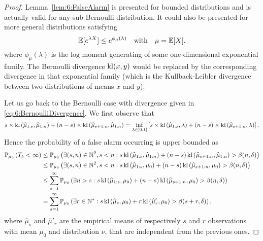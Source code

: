 \begin{proof}
Lemma~\ref{lem:6:FalseAlarm} is presented for bounded distributions and is actually valid for any sub-Bernoulli distribution. It could also be presented for more general distributions satisfying
\begin{equation}
    \mathbb{E}[e^{\lambda X} ] \leq e^{\phi_\mu(\lambda)} \ \ \text{ with } \ \ \mu=\mathbb{E}[X]\label{def:6:subExpo},
\end{equation}
where $\phi_\mu(\lambda)$ is the $\mathrm{log}$ moment generating of some one-dimensional exponential family. The Bernoulli divergence $\mathrm{kl}(x,y)$ would be replaced by the corresponding divergence in that exponential family (which is the Kullback-Leibler divergence between two distributions of means $x$ and $y$).

Let us go back to the Bernoulli case with divergence given in \eqref{eq:6:BernoulliDivergence}.
We first observe that
\[s \times \mathrm{kl}\left(\widehat{\mu}_{1:s},\widehat{\mu}_{1:n}\right) + (n-s) \times \mathrm{kl}\left(\widehat{\mu}_{s+1:n},\widehat{\mu}_{1:n}\right) = \inf_{\lambda \in [0,1]}\left[s \times \mathrm{kl}\left(\widehat{\mu}_{1:s},\lambda\right) + (n-s) \times \mathrm{kl}\left(\widehat{\mu}_{s+1:n},\lambda\right)\right].\]
Hence the probability of a false alarm occurring is upper bounded as
%
\begin{align*}
    \mathbb{P}_{\mu_0}\left(T_{\delta} < \infty\right) & \leq \mathbb{P}_{\mu_0}\left(\exists (s,n) \in \mathbb{N}^2, s < n:  s \, \mathrm{kl}\left(\widehat{\mu}_{1:s},\widehat{\mu}_{1:n}\right) + (n-s) \, \mathrm{kl}\left(\widehat{\mu}_{s+1:n},\widehat{\mu}_{1:n}\right) > \beta(n,\delta)\right)\\
    & \leq \mathbb{P}_{\mu_0}\left(\exists (s,n) \in \mathbb{N}^2, s < n:  s \, \mathrm{kl}\left(\widehat{\mu}_{1:s},\mu_0\right) + (n-s) \, \mathrm{kl}\left(\widehat{\mu}_{s+1:n},\mu_0\right) > \beta(n,\delta)\right) \\
    & \leq \sum_{s =1}^{\infty} \mathbb{P}_{\mu_0}\left(\exists n > s:  s \, \mathrm{kl}\left(\widehat{\mu}_{1:s},\mu_0\right) + (n-s) \, \mathrm{kl}\left(\widehat{\mu}_{s+1:n},\mu_0\right) > \beta(n,\delta)\right)\\
    & =   \sum_{s =1}^{\infty} \mathbb{P}_{\mu_0}\left(\exists r \in \mathbb{N}^*:  s \, \mathrm{kl}\left(\widehat{\mu}_{s},\mu_0\right) + r \, \mathrm{kl}\left(\widehat{\mu}'_{r},\mu_0\right) > \beta(s+r,\delta)\right),
\end{align*}
%
where $\widehat{\mu}_{s}$ and $\widehat{\mu}'_{r}$ are the empirical means of respectively $s$ and $r$ \iid{} observations with mean $\mu_0$ and distribution $\nu$, that are independent from the previous ones.

\end{proof}
